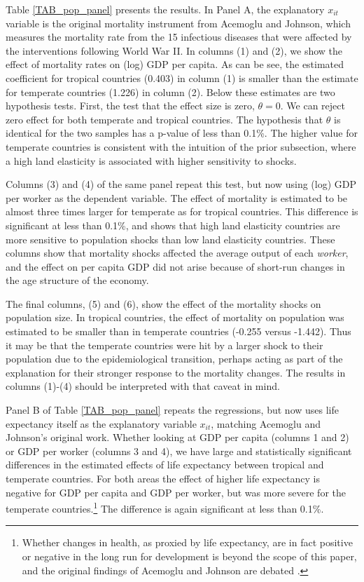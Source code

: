 \documentclass[11pt]{article}
\begin{document}
Table \ref{TAB_pop_panel} presents the results. In Panel A, the explanatory $x_{it}$ variable is the original mortality instrument from Acemoglu and Johnson, which measures the mortality rate from the 15 infectious diseases that were affected by the interventions following World War II. In columns (1) and (2), we show the effect of mortality rates on (log) GDP per capita. As can be see, the estimated coefficient for tropical countries (0.403) in column (1) is smaller than the estimate for temperate countries (1.226) in column (2). Below these estimates are two hypothesis tests. First, the test that the effect size is zero, $\theta=0$. We can reject zero effect for both temperate and tropical countries. The hypothesis that $\theta$ is identical for the two samples has a p-value of less than 0.1\%. The higher value for temperate countries is consistent with the intuition of the prior subsection, where a high land elasticity is associated with higher sensitivity to shocks.

Columns (3) and (4) of the same panel repeat this test, but now using (log) GDP per worker as the dependent variable. The effect of mortality is estimated to be almost three times larger for temperate as for tropical countries. This difference is significant at less than 0.1\%, and shows that high land elasticity countries are more sensitive to population shocks than low land elasticity countries. These columns show that mortality shocks affected the average output of each \textit{worker}, and the effect on per capita GDP did not arise because of short-run changes in the age structure of the economy.

The final columns, (5) and (6), show the effect of the mortality shocks on population size. In tropical countries, the effect of mortality on population was estimated to be smaller than in temperate countries (-0.255 versus -1.442). Thus it may be that the temperate countries were hit by a larger shock to their population due to the epidemiological transition, perhaps acting as part of the explanation for their stronger response to the mortality changes. The results in columns (1)-(4) should be interpreted with that caveat in mind.

Panel B of Table \ref{TAB_pop_panel} repeats the regressions, but now uses life expectancy itself as the explanatory variable $x_{it}$, matching Acemoglu and Johnson's original work. Whether looking at GDP per capita (columns 1 and 2) or GDP per worker (columns 3 and 4), we have large and statistically significant differences in the estimated effects of life expectancy between tropical and temperate countries. For both areas the effect of higher life expectancy is negative for GDP per capita and GDP per worker, but was  more severe for the temperate countries.\footnote{Whether changes in health, as proxied by life expectancy, are in fact positive or negative in the long run for development is beyond the scope of this paper, and the original findings of Acemoglu and Johnson are debated \citep{bcf2014}.} The difference is again significant at less than 0.1\%.
\end{document}
